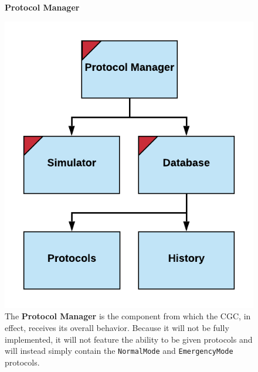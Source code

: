 \documentclass[12pt]{article}
\begin{document}
\begin{figure}[H]
    \centering
    \textbf{Protocol Manager}\par
    \includegraphics[scale=.30]{Protocol-Manager.png}
    \caption{The \textbf{Protocol Manager} is the component from which the CGC, in effect, receives its overall behavior.
    Because it will not be fully implemented, it will not feature the ability to be given protocols and will instead simply
    contain the \texttt{NormalMode} and \texttt{EmergencyMode} protocols.}
    \label{fig:ProtocolManager}
\end{figure}
  

\end{document}
